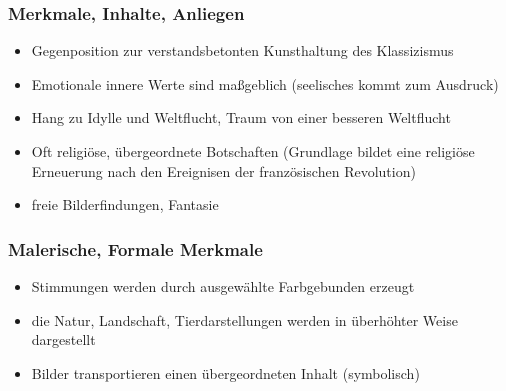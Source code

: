 \subsubsection{Merkmale, Inhalte, Anliegen}
\begin{itemize}
	\item Gegenposition zur verstandsbetonten Kunsthaltung des Klassizismus
	\item Emotionale innere Werte sind maßgeblich (seelisches kommt zum Ausdruck)
	\item Hang zu Idylle und Weltflucht,
	Traum von einer besseren Weltflucht
	\item Oft religiöse, übergeordnete Botschaften
	(Grundlage bildet eine religiöse Erneuerung nach den Ereignisen der französischen Revolution)
	\item freie Bilderfindungen, Fantasie
\end{itemize}

\subsubsection{Malerische, Formale Merkmale}
\begin{itemize}
	\item Stimmungen werden durch ausgewählte Farbgebunden erzeugt
	\item die Natur, Landschaft, Tierdarstellungen werden in überhöhter Weise dargestellt
	\item Bilder transportieren einen übergeordneten Inhalt (symbolisch)
\end{itemize}
